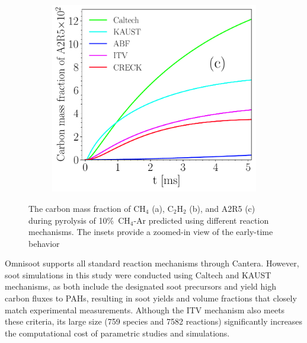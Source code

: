 \begin{figure}[H]
\begin{subfigure}[t]{0.31\textwidth}
	\end{subfigure}
	\begin{subfigure}[t]{0.31\textwidth}
		\includegraphics[width=1\textwidth]{Figures/Results/chemistry/A2R5.pdf}
	\end{subfigure}
	\caption{The carbon mass fraction of $\mathrm{CH_4}$ (a), $\mathrm{C_2H_2}$ (b), and A2R5 (c) during pyrolysis of 10\%~$\mathrm{CH_4}$-Ar predicted using different reaction mechanisms. The insets provide a zoomed-in view of the early-time behavior}
	\label{fig:CH4_C2H4_A2R5_chem} 
\end{figure}

Omnisoot supports all standard reaction mechanisms through Cantera. However, soot simulations in this study were conducted using Caltech and KAUST mechanisms, as both include the designated soot precursors and yield high carbon fluxes to PAHs, resulting in soot yields and volume fractions that closely match experimental measurements. Although the ITV mechanism also meets these criteria, its large size (759 species and 7582 reactions) significantly increases the computational cost of parametric studies and simulations.

%
